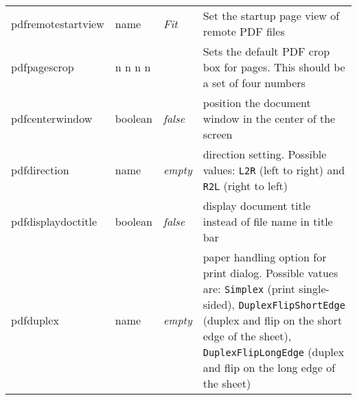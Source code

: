 \documentclass{article}
\begin{document}
\begin{longtable}{@{}>{\ttfamily}l>{\raggedright}p{}>{\itshape}lp{7cm}@{}}
pdfremotestartview & name    & Fit   & Set the startup page view of remote PDF files \\
pdfpagescrop       & n n n n &       & Sets the default PDF crop box for pages. This should be a set of four numbers \\
pdfcenterwindow    & boolean & false & position the document window in the center of the screen \\
pdfdirection       & name    & empty & direction setting. Possible values:  \verb|L2R| (left to right) and
                                       \verb|R2L| (right to left)\\
pdfdisplaydoctitle & boolean & false & display document title instead of file name in title bar\\
pdfduplex          & name    & empty & paper handling option for print dialog. Possible vatues are:
                                       \verb|Simplex| (print single-sided),
                                       \verb|DuplexFlipShortEdge| (duplex and flip on the short edge of the sheet),
                                       \verb|DuplexFlipLongEdge| (duplex and flip on the long edge of the sheet)\\


\end{longtable}
\end{document}
